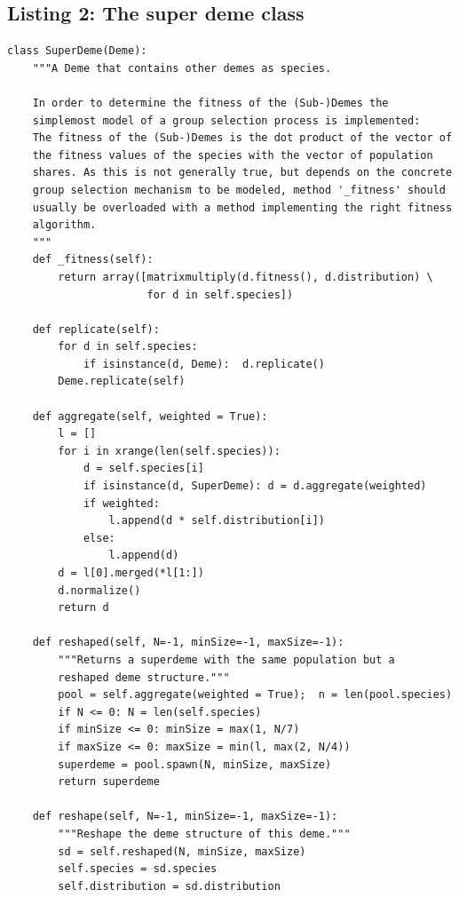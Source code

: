 \subsection{Listing 2: The super deme class}
\label{superdeme}

\begin{scriptsize}
\begin{verbatim}
class SuperDeme(Deme):
    """A Deme that contains other demes as species.   

    In order to determine the fitness of the (Sub-)Demes the 
    simplemost model of a group selection process is implemented:
    The fitness of the (Sub-)Demes is the dot product of the vector of
    the fitness values of the species with the vector of population
    shares. As this is not generally true, but depends on the concrete
    group selection mechanism to be modeled, method '_fitness' should
    usually be overloaded with a method implementing the right fitness
    algorithm.
    """
    def _fitness(self):
        return array([matrixmultiply(d.fitness(), d.distribution) \
                      for d in self.species])

    def replicate(self):
        for d in self.species:
            if isinstance(d, Deme):  d.replicate()
        Deme.replicate(self)

    def aggregate(self, weighted = True):
        l = []
        for i in xrange(len(self.species)):
            d = self.species[i]
            if isinstance(d, SuperDeme): d = d.aggregate(weighted)
            if weighted:
                l.append(d * self.distribution[i])
            else:
                l.append(d)
        d = l[0].merged(*l[1:])
        d.normalize()
        return d

    def reshaped(self, N=-1, minSize=-1, maxSize=-1):
        """Returns a superdeme with the same population but a
        reshaped deme structure."""
        pool = self.aggregate(weighted = True);  n = len(pool.species)
        if N <= 0: N = len(self.species)
        if minSize <= 0: minSize = max(1, N/7)
        if maxSize <= 0: maxSize = min(l, max(2, N/4)) 
        superdeme = pool.spawn(N, minSize, maxSize)
        return superdeme

    def reshape(self, N=-1, minSize=-1, maxSize=-1):
        """Reshape the deme structure of this deme."""
        sd = self.reshaped(N, minSize, maxSize)
        self.species = sd.species
        self.distribution = sd.distribution
\end{verbatim}
\end{scriptsize}

